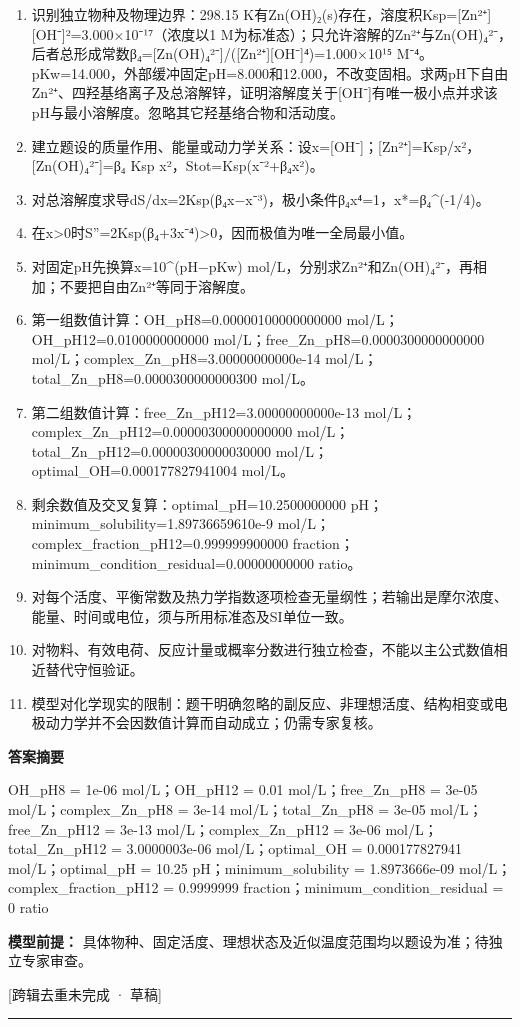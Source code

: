 \documentclass[UTF8,11pt,a4paper]{ctexart}
\begin{document}
\begin{enumerate}
\item 识别独立物种及物理边界：298.15 K有Zn(OH)₂(s)存在，溶度积Ksp=[Zn²⁺][OH⁻]²=3.000×10⁻¹⁷（浓度以1 M为标准态）；只允许溶解的Zn²⁺与Zn(OH)₄²⁻，后者总形成常数β₄=[Zn(OH)₄²⁻]/([Zn²⁺][OH⁻]⁴)=1.000×10¹⁵ M⁻⁴。pKw=14.000，外部缓冲固定pH=8.000和12.000，不改变固相。求两pH下自由Zn²⁺、四羟基络离子及总溶解锌，证明溶解度关于[OH⁻]有唯一极小点并求该pH与最小溶解度。忽略其它羟基络合物和活动度。
\item 建立题设的质量作用、能量或动力学关系：设x=[OH⁻]；[Zn²⁺]=Ksp/x²，[Zn(OH)₄²⁻]=β₄ Ksp x²，Stot=Ksp(x⁻²+β₄x²)。
\item 对总溶解度求导dS/dx=2Ksp(β₄x−x⁻³)，极小条件β₄x⁴=1，x*=β₄\textasciicircum{}(-1/4)。
\item 在x>0时S''=2Ksp(β₄+3x⁻⁴)>0，因而极值为唯一全局最小值。
\item 对固定pH先换算x=10\textasciicircum{}(pH−pKw) mol/L，分别求Zn²⁺和Zn(OH)₄²⁻，再相加；不要把自由Zn²⁺等同于溶解度。
\item 第一组数值计算：OH\_pH8=0.00000100000000000 mol/L；OH\_pH12=0.0100000000000 mol/L；free\_Zn\_pH8=0.0000300000000000 mol/L；complex\_Zn\_pH8=3.00000000000e-14 mol/L；total\_Zn\_pH8=0.0000300000000300 mol/L。
\item 第二组数值计算：free\_Zn\_pH12=3.00000000000e-13 mol/L；complex\_Zn\_pH12=0.00000300000000000 mol/L；total\_Zn\_pH12=0.00000300000030000 mol/L；optimal\_OH=0.000177827941004 mol/L。
\item 剩余数值及交叉复算：optimal\_pH=10.2500000000 pH；minimum\_solubility=1.89736659610e-9 mol/L；complex\_fraction\_pH12=0.999999900000 fraction；minimum\_condition\_residual=0.00000000000 ratio。
\item 对每个活度、平衡常数及热力学指数逐项检查无量纲性；若输出是摩尔浓度、能量、时间或电位，须与所用标准态及SI单位一致。
\item 对物料、有效电荷、反应计量或概率分数进行独立检查，不能以主公式数值相近替代守恒验证。
\item 模型对化学现实的限制：题干明确忽略的副反应、非理想活度、结构相变或电极动力学并不会因数值计算而自动成立；仍需专家复核。
\end{enumerate}
\noindent\textbf{答案摘要}\par
OH\_pH8 = 1e-06 mol/L；OH\_pH12 = 0.01 mol/L；free\_Zn\_pH8 = 3e-05 mol/L；complex\_Zn\_pH8 = 3e-14 mol/L；total\_Zn\_pH8 = 3e-05 mol/L；free\_Zn\_pH12 = 3e-13 mol/L；complex\_Zn\_pH12 = 3e-06 mol/L；total\_Zn\_pH12 = 3.0000003e-06 mol/L；optimal\_OH = 0.000177827941 mol/L；optimal\_pH = 10.25 pH；minimum\_solubility = 1.8973666e-09 mol/L；complex\_fraction\_pH12 = 0.9999999 fraction；minimum\_condition\_residual = 0 ratio\par
\noindent\textbf{模型前提：}
具体物种、固定活度、理想状态及近似温度范围均以题设为准；待独立专家审查。\par
\noindent\textcolor{red!65!black}{[跨辑去重未完成 · 草稿]} \par
\medskip\hrule\medskip
{}
\end{document}
